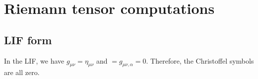\documentclass[main.tex]{subfiles}
\begin{document}
\section{Riemann tensor computations}

\subsection{LIF form}

In the LIF, we have \(g_{\mu \nu } = \eta_{\mu \nu }\) and \(= g_{\mu \nu , \alpha }=0\). Therefore, the Christoffel symbols are all zero. 
\end{document}
